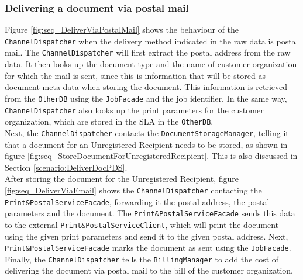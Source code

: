\documentclass[a4paper,10pt]{article}
\begin{document}
\subsubsection{Delivering a document via postal mail}
\label{scenario:DeliverDocPostalMail}
Figure \ref{fig:seq_DeliverViaPostalMail} shows the behaviour of the \texttt{ChannelDispatcher} when the delivery method indicated in the raw data is postal mail. The \texttt{ChannelDispatcher} will first extract the postal address from the raw data. It then looks up the document type and the name of customer organization for which the mail is sent, since this is information that will be stored as document meta-data when storing the document. This information is retrieved from the \texttt{OtherDB} using the \texttt{JobFacade} and the job identifier. In the same way, \texttt{ChannelDispatcher} also looks up the print parameters for the customer organization, which are stored in the SLA in the \texttt{OtherDB}. \\
Next, the \texttt{ChannelDispatcher} contacts the \texttt{DocumentStorageManager}, telling it that a document for an Unregistered Recipient needs to be stored, as shown in figure \ref{fig:seq_StoreDocumentForUnregisteredRecipient}. This is also discussed in Section \ref{scenario:DeliverDocPDS}.\\
After storing the document for the 
Unregistered Recipient, figure \ref{fig:seq_DeliverViaEmail} shows
the \texttt{ChannelDispatcher} contacting the \texttt{Print\&PostalServiceFacade}, forwarding it the postal address, the postal parameters and the document. The  \texttt{Print\&PostalServiceFacade} sends this data to the external \texttt{Print\&PostalServiceClient}, which will print the document using the given print parameters and send it to the given postal address. Next, \texttt{Print\&PostalServiceFacade} marks the document as sent using the \texttt{JobFacade}. Finally, the \texttt{ChannelDispatcher} tells the \texttt{BillingManager} to add the cost of delivering the document via postal mail to the bill of the customer organization.
\end{document}
